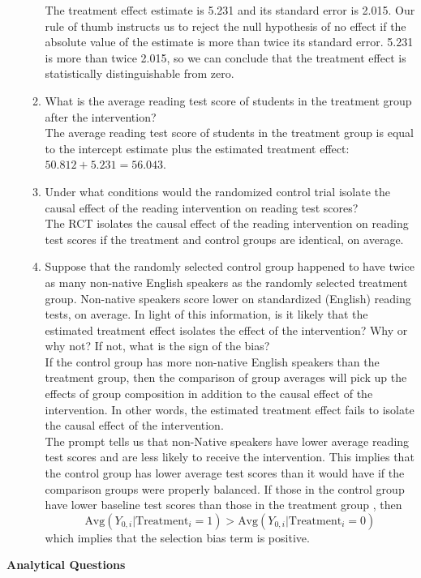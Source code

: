 \documentclass[11pt]{article}
\begin{document}
\begin{onehalfspacing}
\begin{enumerate}
\begin{enumerate}
	{\color{pine_green} The treatment effect estimate is 5.231 and its standard error is 2.015. Our rule of thumb instructs us to reject the null hypothesis of no effect if the absolute value of the estimate is more than twice its standard error. 5.231 is more than twice 2.015, so we can conclude that the treatment effect is statistically distinguishable from zero.}\\
	
	\item What is the average reading test score of students in the treatment group after the intervention? \\
	
	{\color{pine_green} The average reading test score of students in the treatment group is equal to the intercept estimate plus the estimated treatment effect: $50.812 + 5.231 = 56.043$.}\\
	
	\item Under what conditions would the randomized control trial isolate the causal effect of the reading intervention on reading test scores?\\
	
	{\color{pine_green} The RCT isolates the causal effect of the reading intervention on reading test scores if the treatment and control groups are identical, on average.}\\
	
	\item Suppose that the randomly selected control group happened to have twice as many non-native English speakers as the randomly selected treatment group. Non-native speakers score lower on standardized (English) reading tests, on average. In light of this information, is it likely that the estimated treatment effect isolates the effect of the intervention? Why or why not? If not, what is the sign of the bias?\\
	
		{\color{pine_green} If the control group has more non-native English speakers than the treatment group, then the comparison of group averages will pick up the effects of group composition in addition to the causal effect of the intervention. In other words, the estimated treatment effect fails to isolate the causal effect of the intervention. \\
		
		The prompt tells us that non-Native speakers have lower average reading test scores and are less likely to receive the intervention.  This implies that the control group has lower average test scores than it would have if the comparison groups were properly balanced. If those in the control group have lower baseline test scores than those in the treatment group , then $$\text{Avg}(Y_{0, i} | \text{Treatment}_i = 1) > \text{Avg}(Y_{0, i} | \text{Treatment}_i = 0)$$ which implies that the selection bias term is positive.}
\end{enumerate}
\end{enumerate}
\clearpage
\begin{center}
\textbf{Analytical Questions} \bigskip
\end{center}


\end{onehalfspacing}
\end{document}
